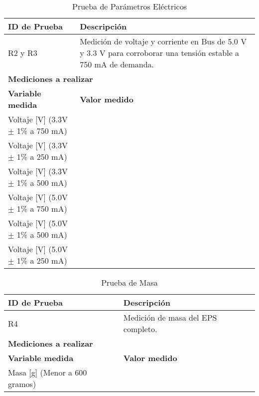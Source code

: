 \begin{table}[h]
    \centering
    \begin{tabular}{|m{6.5cm}|m{6.5cm}|}
    \hline
        \textbf{ID de Prueba} & \textbf{Descripción} \\ \hline
        \centering R2 y R3 & Medición de voltaje y corriente en Bus de 5.0 V y 3.3 V para corroborar una tensión estable a 750 mA de demanda. \\ \hline
        \multicolumn{2}{|m{13cm}|}{\centering\textbf{Mediciones a realizar}} \\ \hline
        \textbf{Variable medida} & \textbf{Valor medido} \\ \hline
        Voltaje [V] (3.3V $\pm$ 1\% a 750 mA) & ~ \\ \hline
        Voltaje [V] (3.3V $\pm$ 1\% a 250 mA) & ~ \\ \hline
        Voltaje [V] (3.3V $\pm$ 1\% a 500 mA) & ~ \\ \hline
        Voltaje [V] (5.0V $\pm$ 1\% a 750 mA) & ~ \\ \hline
        Voltaje [V] (5.0V $\pm$ 1\% a 500 mA) & ~ \\ \hline
        Voltaje [V] (5.0V $\pm$ 1\% a 250 mA) & ~ \\ \hline
    \end{tabular}
    \caption{Prueba de Parámetros Eléctricos}
    \label{tab:voltagecurrentmeasurement}
\end{table}

\newpage

\begin{table}[h]
    \centering
    \begin{tabular}{|m{6.5cm}|m{6.5cm}|}
    \hline
        \textbf{ID de Prueba} & \textbf{Descripción} \\ \hline
        \centering R4 & Medición de masa del EPS completo. \\ \hline
        \multicolumn{2}{|m{13cm}|}{\centering\textbf{Mediciones a realizar}} \\ \hline
        \textbf{Variable medida} & \textbf{Valor medido} \\ \hline
        Masa [g] (Menor a 600 gramos) & ~ \\ \hline
    \end{tabular}
    \caption{Prueba de Masa}
    \label{tab:MassMeasurement}
\end{table}



